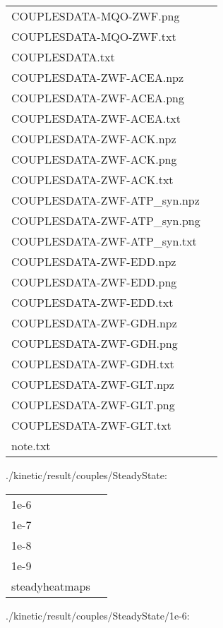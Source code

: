 \documentclass[a4paper, parskip=full]{scrreprt}
\begin{document}
\begin{longtable}{ll}
COUPLESDATA-MQO-ZWF.png\\
COUPLESDATA-MQO-ZWF.txt\\
COUPLESDATA.txt\\
COUPLESDATA-ZWF-ACEA.npz\\
COUPLESDATA-ZWF-ACEA.png\\
COUPLESDATA-ZWF-ACEA.txt\\
COUPLESDATA-ZWF-ACK.npz\\
COUPLESDATA-ZWF-ACK.png\\
COUPLESDATA-ZWF-ACK.txt\\
COUPLESDATA-ZWF-ATP\_syn.npz\\
COUPLESDATA-ZWF-ATP\_syn.png\\
COUPLESDATA-ZWF-ATP\_syn.txt\\
COUPLESDATA-ZWF-EDD.npz\\
COUPLESDATA-ZWF-EDD.png\\
COUPLESDATA-ZWF-EDD.txt\\
COUPLESDATA-ZWF-GDH.npz\\
COUPLESDATA-ZWF-GDH.png\\
COUPLESDATA-ZWF-GDH.txt\\
COUPLESDATA-ZWF-GLT.npz\\
COUPLESDATA-ZWF-GLT.png\\
COUPLESDATA-ZWF-GLT.txt\\
note.txt
\end{longtable}

./kinetic/result/couples/SteadyState:

\begin{longtable}{ll}
1e-6\\
1e-7\\
1e-8\\
1e-9\\
steadyheatmaps
\end{longtable}

./kinetic/result/couples/SteadyState/1e-6:
\end{document}
